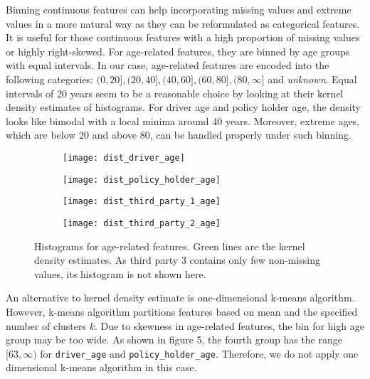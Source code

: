 \documentclass[12pt]{article}
\begin{document}
Binning continuous features can help incorporating missing values and extreme values in a more natural way as they can be reformulated as categorical features. It is useful for those continuous features with a high proportion of missing values or highly right-skewed. For age-related features, they are binned by age groups with equal intervals. In our case, age-related features are encoded into the following categories: $(0, 20], (20, 40], (40, 60], (60, 80], (80, \infty]$ and \textit{unknown}. Equal intervals of 20 years seem to be a reasonable choice by looking at their kernel density estimates of histograms. For driver age and policy holder age, the density looks like bimodal with a local minima around 40 years. Moreover, extreme ages, which are below 20 and above 80, can be handled properly under such binning. 

\begin{figure}[h]
\centering
\begin{subfigure}{.5\textwidth}
  \centering
  \texttt{[image: dist\_driver\_age]}
  \label{fig:sub1}
\end{subfigure}%
\begin{subfigure}{.5\textwidth}
  \centering
  \texttt{[image: dist\_policy\_holder\_age]}
  \label{fig:sub2}
\end{subfigure}
\vspace{-1cm}
\begin{subfigure}{.5\textwidth}
  \centering
  \texttt{[image: dist\_third\_party\_1\_age]}
  \label{fig:sub3}
\end{subfigure}%
\begin{subfigure}{.5\textwidth}
  \centering
  \texttt{[image: dist\_third\_party\_2\_age]}
  \label{fig:sub4}
\end{subfigure}
\caption{Histograms for age-related features. Green lines are the kernel density estimates. As third party 3 contains only few non-missing values, its histogram is not shown here.}
\label{fig:feature_engineering_age}
\end{figure}

An alternative to kernel density estimate is one-dimensional k-means algorithm. However, k-means algorithm partitions features based on mean and the specified number of clusters $k$. Due to skewness in age-related features, the bin for high age group may be too wide. As shown in figure 5, the fourth group has the range $[63, \infty)$ for \texttt{driver\_age} and \texttt{policy\_holder\_age}. Therefore, we do not apply one dimensional k-means algorithm in this case. 
\end{document}

